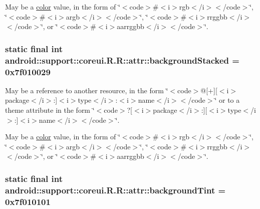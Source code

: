 May be a \hyperlink{classandroid_1_1support_1_1coreui_1_1_r_1_1color}{color} value, in the form of \char`\"{}$<$code$>$\#$<$i$>$rgb$<$/i$>$$<$/code$>$\char`\"{}, \char`\"{}$<$code$>$\#$<$i$>$argb$<$/i$>$$<$/code$>$\char`\"{}, \char`\"{}$<$code$>$\#$<$i$>$rrggbb$<$/i$>$$<$/code$>$\char`\"{}, or \char`\"{}$<$code$>$\#$<$i$>$aarrggbb$<$/i$>$$<$/code$>$\char`\"{}. \hypertarget{classandroid_1_1support_1_1coreui_1_1_r_1_1attr_36435c904c943426a08dd2c8c62680f5}{
\subsubsection[{backgroundStacked}]{\setlength{\rightskip}{0pt plus 5cm}static final int android::support::coreui.R.R::attr::backgroundStacked = 0x7f010029}}
\label{classandroid_1_1support_1_1coreui_1_1_r_1_1attr_36435c904c943426a08dd2c8c62680f5}


May be a reference to another resource, in the form \char`\"{}$<$code$>$@\mbox{[}+\mbox{]}\mbox{[}$<$i$>$package$<$/i$>$:\mbox{]}$<$i$>$type$<$/i$>$:$<$i$>$name$<$/i$>$$<$/code$>$\char`\"{} or to a theme attribute in the form \char`\"{}$<$code$>$?\mbox{[}$<$i$>$package$<$/i$>$:\mbox{]}\mbox{[}$<$i$>$type$<$/i$>$:\mbox{]}$<$i$>$name$<$/i$>$$<$/code$>$\char`\"{}. 

May be a \hyperlink{classandroid_1_1support_1_1coreui_1_1_r_1_1color}{color} value, in the form of \char`\"{}$<$code$>$\#$<$i$>$rgb$<$/i$>$$<$/code$>$\char`\"{}, \char`\"{}$<$code$>$\#$<$i$>$argb$<$/i$>$$<$/code$>$\char`\"{}, \char`\"{}$<$code$>$\#$<$i$>$rrggbb$<$/i$>$$<$/code$>$\char`\"{}, or \char`\"{}$<$code$>$\#$<$i$>$aarrggbb$<$/i$>$$<$/code$>$\char`\"{}. \hypertarget{classandroid_1_1support_1_1coreui_1_1_r_1_1attr_69ebaf80f51903ff289990f0c79448f2}{
\subsubsection[{backgroundTint}]{\setlength{\rightskip}{0pt plus 5cm}static final int android::support::coreui.R.R::attr::backgroundTint = 0x7f010101}}
\label{classandroid_1_1support_1_1coreui_1_1_r_1_1attr_69ebaf80f51903ff289990f0c79448f2}


